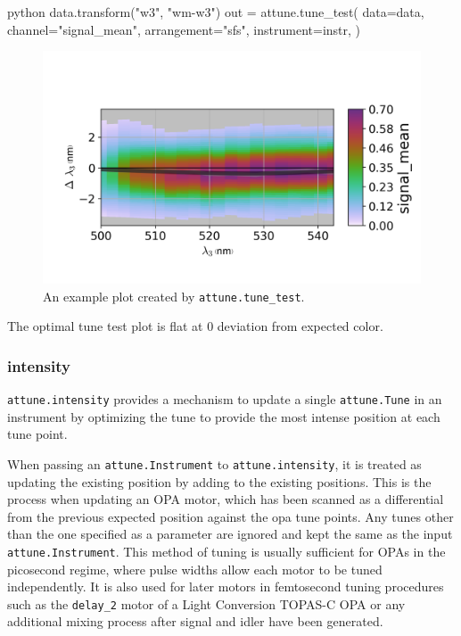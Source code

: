 \begin{codefragment}{python}
data.transform("w3", "wm-w3")
out = attune.tune_test(
    data=data,
    channel="signal_mean",
    arrangement="sfs",
    instrument=instr,
)
\end{codefragment}

\begin{figure}
\includegraphics{representation/images/tune_test.png}
\caption[Tune Test]{
	An example plot created by \texttt{attune.tune\_test}.
}
\label{rep:fig:tune_test}
\end{figure}

The optimal tune test plot is flat at 0 deviation from expected color.

\hypertarget{intensity}{%
\subsubsection{intensity}\label{intensity}}

\texttt{attune.intensity} provides a mechanism to
update a single \texttt{attune.Tune} in an instrument
by optimizing the tune to provide the most intense position at each tune
point.

When passing an \texttt{attune.Instrument} to
\texttt{attune.intensity}, it is treated as updating
the existing position by adding to the existing positions. This is the
process when updating an OPA motor, which has been scanned as a
differential from the previous expected position against the opa tune
points. Any tunes other than the one specified as a parameter are
ignored and kept the same as the input
\texttt{attune.Instrument}. This method of tuning is
usually sufficient for OPAs in the picosecond regime, where pulse widths
allow each motor to be tuned independently. It is also used for later
motors in femtosecond tuning procedures such as the \texttt{delay\_2}
motor of a Light Conversion TOPAS-C OPA or any additional mixing process
after signal and idler have been generated.


